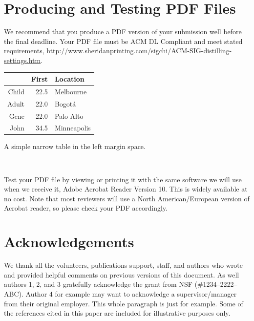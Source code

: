 \documentclass{sigchi-ext}
\begin{document}
\section{Producing and Testing PDF Files}
We recommend that you produce a PDF version of your submission well
before the final deadline. Your PDF file must be ACM DL Compliant and
meet stated requirements,
\url{http://www.sheridanprinting.com/sigchi/ACM-SIG-distilling-settings.htm}.


\begin{margintable}[1pc]
  \begin{minipage}{\marginparwidth}
    \centering
    \begin{tabular}{r r l}
      & {\small \textbf{First}}
      & {\small \textbf{Location}} \\
      \toprule
      Child & 22.5 & Melbourne \\
      Adult & 22.0 & Bogot\'a \\
      \midrule
      Gene & 22.0 & Palo Alto \\
      John & 34.5 & Minneapolis \\
      \bottomrule
    \end{tabular}
    \caption{A simple narrow table in the left margin
      space.}~\label{tab:table2}
  \end{minipage}
\end{margintable}
Test your PDF file by viewing or printing it with the same software we
will use when we receive it, Adobe Acrobat Reader Version 10. This is
widely available at no cost. Note that most
reviewers will use a North American/European version of Acrobat
reader, so please check your PDF accordingly.

\section{Acknowledgements}
We thank all the volunteers, publications support, staff, and authors
who wrote and provided helpful comments on previous versions of this
document. As well authors 1, 2, and 3 gratefully acknowledge the grant
from NSF (\#1234--2222--ABC). Author 4 for example may want to
acknowledge a supervisor/manager from their original employer. This
whole paragraph is just for example. Some of the references cited in
this paper are included for illustrative purposes only.
\end{document}

